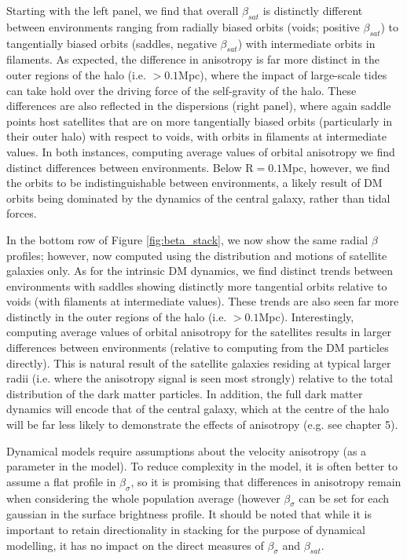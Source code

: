 Starting with the left panel, we find that overall $\beta_{sat}$ is distinctly different between environments ranging from radially biased orbits (voids; positive $\beta_{sat}$) to tangentially biased orbits (saddles, negative $\beta_{sat}$) with intermediate orbits in filaments. As expected, the difference in anisotropy is far more distinct in the outer regions of the halo (i.e. $> 0.1$Mpc), where the impact of large-scale tides can take hold over the driving force of the self-gravity of the halo. These differences are also reflected in the dispersions (right panel), where again saddle points host satellites that are on more tangentially biased orbits (particularly in their outer halo) with respect to voids, with orbits in filaments at intermediate values. In both instances, computing average values of orbital anisotropy we find distinct differences between environments. Below $\mathrm{R = 0.1}$Mpc, however, we find the orbits to be indistinguishable between environments, a likely result of DM orbits being dominated by the dynamics of the central galaxy, rather than tidal forces. 

In the bottom row of Figure \ref{fig:beta_stack}, we now show the same radial $\beta$ profiles; however, now computed using the distribution and motions of satellite galaxies only. As for the intrinsic DM dynamics, we find distinct trends between environments with saddles showing distinctly more tangential orbits relative to voids (with filaments at intermediate values). These trends are also seen far more distinctly in the outer regions of the halo (i.e. $> 0.1$Mpc). Interestingly, computing average values of orbital anisotropy for the satellites results in larger differences between environments (relative to computing from the DM particles directly). This is natural result of the satellite galaxies residing at typical larger radii (i.e. where the anisotropy signal is seen most strongly) relative to the total distribution of the dark matter particles. In addition, the full dark matter dynamics will encode that of the central galaxy, which at the centre of the halo will be far less likely to demonstrate the effects of anisotropy (e.g. see chapter 5). 

Dynamical models require assumptions about the velocity anisotropy (as a parameter in the model). To reduce complexity in the model, it is often better to assume a flat profile in $\beta_{\sigma}$, so it is promising that differences in anisotropy remain when considering the whole population average (however $\beta_{\sigma}$ can be set for each gaussian in the surface brightness profile. It should be noted that while it is important to retain directionality in stacking for the purpose of dynamical modelling, it has no impact on the direct measures of $\beta_{\sigma}$ and $\beta_{sat}$.


